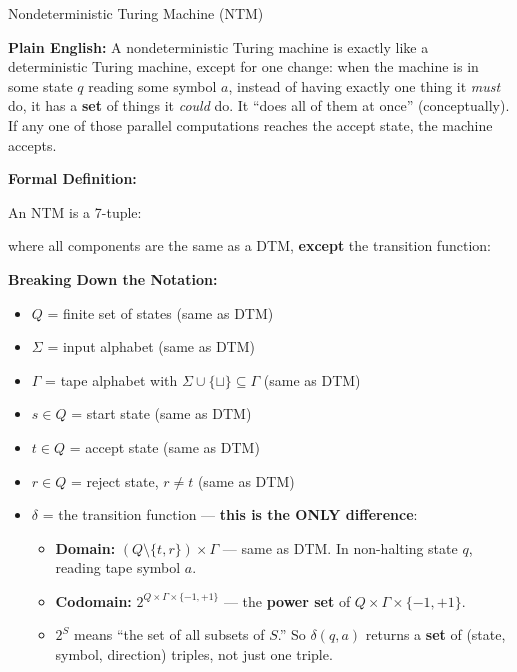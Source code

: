 \begin{definitionbox}{Nondeterministic Turing Machine (NTM)}

\textbf{Plain English:}
A nondeterministic Turing machine is exactly like a deterministic Turing
machine, except for one change: when the machine is in some state $q$ reading
some symbol $a$, instead of having exactly one thing it \emph{must} do, it has
a \textbf{set} of things it \emph{could} do. It ``does all of them at once''
(conceptually). If any one of those parallel computations reaches the accept
state, the machine accepts.

\textbf{Formal Definition:}

An NTM is a 7-tuple:

where all components are the same as a DTM, \textbf{except} the transition
function:


\textbf{Breaking Down the Notation:}
\begin{itemize}[nosep]
\item $Q$ = finite set of states (same as DTM)
\item $\Sigma$ = input alphabet (same as DTM)
\item $\Gamma$ = tape alphabet with $\Sigma \cup \{\sqcup\} \subseteq \Gamma$
  (same as DTM)
\item $s \in Q$ = start state (same as DTM)
\item $t \in Q$ = accept state (same as DTM)
\item $r \in Q$ = reject state, $r \neq t$ (same as DTM)
\item $\delta$ = the transition function --- \textbf{this is the ONLY difference}:
  \begin{itemize}[nosep]
  \item \textbf{Domain:} $(Q \setminus \{t, r\}) \times \Gamma$ --- same as DTM.
    In non-halting state $q$, reading tape symbol $a$.
  \item \textbf{Codomain:} $2^{Q \times \Gamma \times \{-1, +1\}}$ --- the
    \textbf{power set} of $Q \times \Gamma \times \{-1, +1\}$.
  \item $2^S$ means ``the set of all subsets of $S$.'' So $\delta(q, a)$ returns
    a \textbf{set} of (state, symbol, direction) triples, not just one triple.
  \end{itemize}
\end{itemize}


\end{definitionbox}
